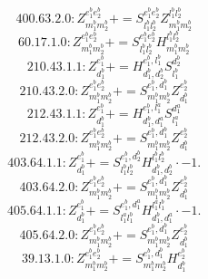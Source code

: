 \documentclass[letterpaper,10pt,fleqn,leqno,onecolumn]{article}
\begin{document}
\begin{equation} \;\;\;\;\;\;  400.63.2.0: Z^{e_{1}^{b}e_{2}^{b}}_{m_{1}^{b}m_{2}^{b}}+=S^{e_{1}^{b}e_{2}^{b}}_{l_{1}^{b}l_{2}^{b}}Z^{l_{1}^{b}l_{2}^{b}}_{m_{1}^{b}m_{2}^{b}} \end{equation}
\begin{equation} \;\;\;\;\;\;  60.17.1.0: Z^{e_{1}^{b}e_{2}^{b}}_{m_{1}^{b}m_{2}^{b}}+=S^{e_{1}^{b}e_{2}^{b}}_{l_{1}^{b}l_{2}^{b}}H^{l_{1}^{b}l_{2}^{b}}_{m_{1}^{b}m_{2}^{b}} \end{equation}
\begin{equation} \;\;\;\;\;\;  210.43.1.1: Z^{e_{1}^{b}}_{d_{1}^{b}}+=H^{e_{1}^{b},l_{1}^{b}}_{d_{1}^{b},d_{2}^{b}}S^{d_{2}^{b}}_{l_{1}^{b}} \end{equation}
\begin{equation} \;\;\;\;\;\;  210.43.2.0: Z^{e_{1}^{b}e_{2}^{b}}_{m_{1}^{b}m_{2}^{b}}+=S^{e_{1}^{b},d_{1}^{b}}_{m_{1}^{b}m_{2}^{b}}Z^{e_{2}^{b}}_{d_{1}^{b}} \end{equation}
\begin{equation} \;\;\;\;\;\;  212.43.1.1: Z^{e_{1}^{b}}_{d_{1}^{b}}+=H^{e_{1}^{b},l_{1}^{a}}_{d_{1}^{b},d_{1}^{a}}S^{d_{1}^{a}}_{l_{1}^{a}} \end{equation}
\begin{equation} \;\;\;\;\;\;  212.43.2.0: Z^{e_{1}^{b}e_{2}^{b}}_{m_{1}^{b}m_{2}^{b}}+=S^{e_{1}^{b},d_{1}^{b}}_{m_{1}^{b}m_{2}^{b}}Z^{e_{2}^{b}}_{d_{1}^{b}} \end{equation}
\begin{equation} \;\;\;\;\;\;  403.64.1.1: Z^{e_{1}^{b}}_{d_{1}^{b}}+=S^{e_{1}^{b},d_{2}^{b}}_{l_{1}^{b}l_{2}^{b}}H^{l_{1}^{b}l_{2}^{b}}_{d_{1}^{b},d_{2}^{b}}\cdot -1. \end{equation}
\begin{equation} \;\;\;\;\;\;  403.64.2.0: Z^{e_{1}^{b}e_{2}^{b}}_{m_{1}^{b}m_{2}^{b}}+=S^{e_{1}^{b},d_{1}^{b}}_{m_{1}^{b}m_{2}^{b}}Z^{e_{2}^{b}}_{d_{1}^{b}} \end{equation}
\begin{equation} \;\;\;\;\;\;  405.64.1.1: Z^{e_{1}^{b}}_{d_{1}^{b}}+=S^{e_{1}^{b},d_{1}^{a}}_{l_{1}^{a}l_{1}^{b}}H^{l_{1}^{a}l_{1}^{b}}_{d_{1}^{b},d_{1}^{a}}\cdot -1. \end{equation}
\begin{equation} \;\;\;\;\;\;  405.64.2.0: Z^{e_{1}^{b}e_{2}^{b}}_{m_{1}^{b}m_{2}^{b}}+=S^{e_{1}^{b},d_{1}^{b}}_{m_{1}^{b}m_{2}^{b}}Z^{e_{2}^{b}}_{d_{1}^{b}} \end{equation}
\begin{equation} \;\;\;\;\;\;  39.13.1.0: Z^{e_{1}^{b}e_{2}^{b}}_{m_{1}^{b}m_{2}^{b}}+=S^{e_{1}^{b},d_{1}^{b}}_{m_{1}^{b}m_{2}^{b}}H^{e_{2}^{b}}_{d_{1}^{b}} \end{equation}
\end{document}

